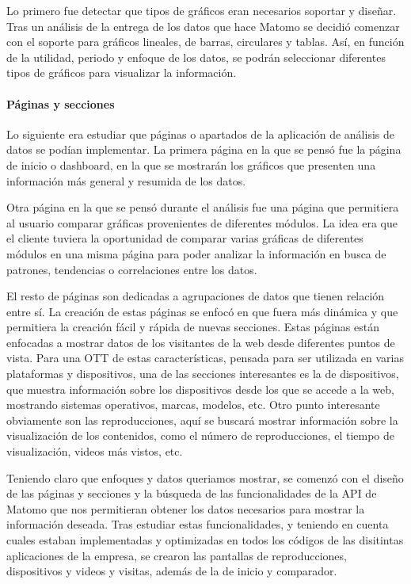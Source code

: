 Lo primero fue detectar que tipos de gráficos eran necesarios soportar y diseñar. Tras un análisis de la entrega de los datos
que hace Matomo se decidió comenzar con el soporte para gráficos lineales, de barras, circulares y tablas. Así, en función 
de la utilidad, periodo y enfoque de los datos, se podrán seleccionar diferentes tipos de gráficos para visualizar la información.

\paragraph{Páginas y secciones}
Lo siguiente era estudiar que páginas o apartados de la aplicación de análisis de datos se podían implementar. La primera página en la que 
se pensó fue la página de inicio o dashboard, en la que se mostrarán los gráficos que presenten una información más general y resumida
de los datos. 

Otra página en la que se pensó durante el análisis fue una página que permitiera al usuario comparar gráficas provenientes de diferentes
módulos. La idea era que el cliente tuviera la oportunidad de comparar varias gráficas de diferentes módulos en una misma página para 
poder analizar la información en busca de patrones, tendencias o correlaciones entre los datos.

El resto de páginas son dedicadas a agrupaciones de datos que tienen relación entre sí. La creación de estas páginas se enfocó en 
que fuera más dinámica y que permitiera la creación fácil y rápida de nuevas secciones. Estas páginas están enfocadas a mostrar 
datos de los visitantes de la web desde diferentes puntos de vista. Para una OTT de estas características, pensada para ser 
utilizada en varias plataformas y dispositivos, una de las secciones interesantes es la de dispositivos, que muestra información
sobre los dispositivos desde los que se accede a la web, mostrando sistemas operativos, marcas, modelos, etc. Otro punto interesante 
obviamente son las reproducciones, aquí se buscará mostrar información sobre la visualización de los contenidos, como el número de 
reproducciones, el tiempo de visualización, videos más vistos, etc.

Teniendo claro que enfoques y datos queriamos mostrar, se comenzó con el diseño de las páginas y secciones y la búsqueda de las 
funcionalidades de la API de Matomo que nos permitieran obtener los datos necesarios para mostrar la información deseada.
Tras estudiar estas funcionalidades, y teniendo en cuenta cuales estaban implementadas y optimizadas en todos los códigos de
las disitintas aplicaciones de la empresa, se crearon las pantallas de reproducciones, dispositivos y videos y visitas, además de
la de inicio y comparador.

